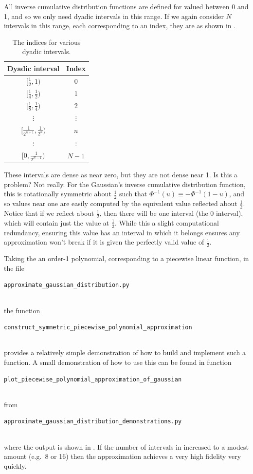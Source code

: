 \documentclass[11pt,a4paper,oneside,english]{extarticle}
\newcommand{\singlecodeline}[1]{\\[1em]\centerline{\lstinline[basicstyle=\ttfamily]$#1$}\\[1em]}
\begin{document}
All inverse cumulative distribution functions are defined for valued between 0 and 1, and so we only need dyadic intervals in this range. If we again consider $ N $ intervals in this range, each corresponding to an index, they are as shown in .

\begin{table}[htb]
\centering
\begin{tabular}{cc}
Dyadic interval         & Index \\ \hline
$ [\tfrac{1}{2}, 1) $           &          0           \\
$ [\tfrac{1}{4}, \tfrac{1}{2}) $     &          1           \\
$ [\tfrac{1}{8}, \tfrac{1}{4}) $     &          2           \\
$ \vdots $                &      $ \vdots $      \\
$ [\tfrac{1}{2^{n+1}}, \tfrac{1}{2^n}) $ &        $ n $ \\
$ \vdots $                &      $ \vdots $      \\
$ [0, \tfrac{1}{2^{N-1}}) $ &        $ N-1 $
\end{tabular}
\caption{The indices for various dyadic intervals.}
\label{tab:dyadic_intervals_array_indices}
\end{table}

These intervals are dense as near zero, but they are not dense near 1. Is this a problem? Not really. For the Gaussian's inverse cumulative distribution function, this is rotationally symmetric about $ \tfrac{1}{2} $ such that $ \Phi^{-1}(u) \equiv -\Phi^{-1}(1-u) $, and so values near one are easily computed by the equivalent value reflected about $ \tfrac{1}{2} $. Notice that if we reflect about $ \tfrac{1}{2} $, then there will be one interval (the 0 interval), which will contain just the value at $ \tfrac{1}{2} $. While this a slight computational redundancy, ensuring this value has an interval in which it belongs ensures any approximation won't break if it is given the perfectly valid value of $ \tfrac{1}{2} $.

Taking the an order-1 polynomial, corresponding to a piecewise linear function, in the file \singlecodeline{approximate_gaussian_distribution.py} the function \singlecodeline{construct_symmetric_piecewise_polynomial_approximation} provides a relatively simple demonstration of how to build and implement such a function. A small demonstration of how to use this can be found in function \singlecodeline{plot_piecewise_polynomial_approximation_of_gaussian} from \singlecodeline{approximate_gaussian_distribution_demonstrations.py}
where the output is shown in . If the number of intervals in increased to a modest amount (e.g.~8 or 16) then the approximation achieves a very high fidelity very quickly. 
\end{document}
